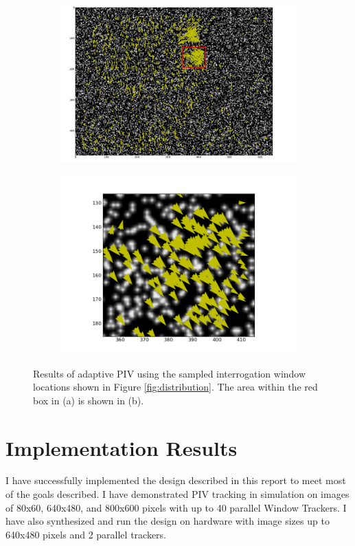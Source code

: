 \documentclass{article}
\begin{document}
\begin{figure}
	\centering
	\begin{subfigure}[htb]{0.8\textwidth}
		\centering
		\includegraphics[width=\textwidth]{fig/adaptive_1000_zoomed_out_box.png}
	\end{subfigure}
	\begin{subfigure}[htb]{0.6\textwidth}
		\centering
		\includegraphics[width=\textwidth]{fig/adaptive_1000_detail.png}
	\end{subfigure}
	\caption{Results of adaptive PIV using the sampled interrogation window locations shown in Figure \ref{fig:distribution}. The area within the red box in (a) is shown in (b).}
	\label{fig:adaptive} 
\end{figure}

\section{Implementation Results}
I have successfully implemented the design described in this report to meet most of the goals described. I have demonstrated PIV tracking in simulation on images of 80x60, 640x480, and 800x600 pixels with up to 40 parallel Window Trackers. I have also synthesized and run the design on hardware with image sizes up to 640x480 pixels and 2 parallel trackers. 
\end{document}
